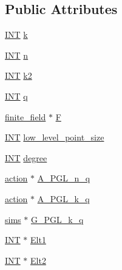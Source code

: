 \subsection*{Public Attributes}
\begin{DoxyCompactItemize}
\item 
\mbox{\hyperlink{galois_8h_a09fddde158a3a20bd2dcadb609de11dc}{I\+NT}} \mbox{\hyperlink{classaction__on__spread__set_ae55145e8d9f8e72d36bcf7bdd4eff8ad}{k}}
\item 
\mbox{\hyperlink{galois_8h_a09fddde158a3a20bd2dcadb609de11dc}{I\+NT}} \mbox{\hyperlink{classaction__on__spread__set_a3d395c47de58b859bbd5462c97348228}{n}}
\item 
\mbox{\hyperlink{galois_8h_a09fddde158a3a20bd2dcadb609de11dc}{I\+NT}} \mbox{\hyperlink{classaction__on__spread__set_af4889da67bd1b0279b70dab846e2720c}{k2}}
\item 
\mbox{\hyperlink{galois_8h_a09fddde158a3a20bd2dcadb609de11dc}{I\+NT}} \mbox{\hyperlink{classaction__on__spread__set_a3c403012638bd2c941df564c540ead4e}{q}}
\item 
\mbox{\hyperlink{classfinite__field}{finite\+\_\+field}} $\ast$ \mbox{\hyperlink{classaction__on__spread__set_ab8043d98d961548859443848354d65d6}{F}}
\item 
\mbox{\hyperlink{galois_8h_a09fddde158a3a20bd2dcadb609de11dc}{I\+NT}} \mbox{\hyperlink{classaction__on__spread__set_a799becbbbf589513fd4ddae2e5b2be9a}{low\+\_\+level\+\_\+point\+\_\+size}}
\item 
\mbox{\hyperlink{galois_8h_a09fddde158a3a20bd2dcadb609de11dc}{I\+NT}} \mbox{\hyperlink{classaction__on__spread__set_ab9788ec2abaac57423848d52561c6410}{degree}}
\item 
\mbox{\hyperlink{classaction}{action}} $\ast$ \mbox{\hyperlink{classaction__on__spread__set_a62ad6313e28bea11aa6ff84b5dddb512}{A\+\_\+\+P\+G\+L\+\_\+n\+\_\+q}}
\item 
\mbox{\hyperlink{classaction}{action}} $\ast$ \mbox{\hyperlink{classaction__on__spread__set_aa17cebd06f6d9ece00607c9ad242df93}{A\+\_\+\+P\+G\+L\+\_\+k\+\_\+q}}
\item 
\mbox{\hyperlink{classsims}{sims}} $\ast$ \mbox{\hyperlink{classaction__on__spread__set_a8699ddf7bb77424cafa67c0826077eb8}{G\+\_\+\+P\+G\+L\+\_\+k\+\_\+q}}
\item 
\mbox{\hyperlink{galois_8h_a09fddde158a3a20bd2dcadb609de11dc}{I\+NT}} $\ast$ \mbox{\hyperlink{classaction__on__spread__set_a8bca95aec401fd09b21967836b19b842}{Elt1}}
\item 
\mbox{\hyperlink{galois_8h_a09fddde158a3a20bd2dcadb609de11dc}{I\+NT}} $\ast$ \mbox{\hyperlink{classaction__on__spread__set_a236b39653824f02028c5473444a93671}{Elt2}}

\end{DoxyCompactItemize}
